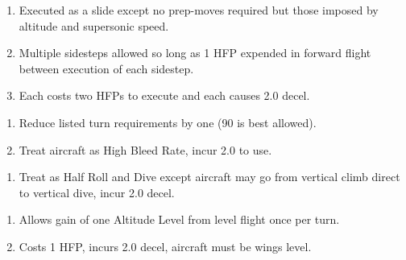 \begin{table*}
\begin{multicols}{2}


\begin{enumerate}[nosep]
    \item Executed as a slide except no prep-moves required but those imposed by altitude and supersonic speed.
    \item Multiple sidesteps allowed so long as 1 HFP expended in forward flight between execution of each sidestep.
    \item Each costs two HFPs to execute and each causes 2.0 decel.
\end{enumerate}


\begin{enumerate}[nosep]
    \item Reduce listed turn requirements by one (90 is best allowed).
    \item Treat aircraft as High Bleed Rate, incur 2.0 to use.
\end{enumerate}


\begin{enumerate}[nosep]
    \item Treat as Half Roll and Dive except aircraft may go from vertical climb direct to vertical dive, incur 2.0 decel.
\end{enumerate}


\begin{enumerate}[nosep]
    \item Allows gain of one Altitude Level from level flight once per turn.
    \item Costs 1 HFP, incurs 2.0 decel, aircraft must be wings level.
\end{enumerate}

\end{multicols}

\end{table*}